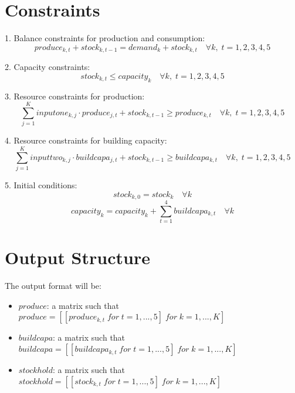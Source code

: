 \documentclass{article}
\begin{document}
\section*{Constraints}
1. Balance constraints for production and consumption:
\[
produce_{k, t} + stock_{k, t-1} = demand_{k} + stock_{k, t} \quad \forall k, \; t=1,2,3,4,5
\]

2. Capacity constraints:
\[
stock_{k, t} \leq capacity_{k} \quad \forall k, \; t=1,2,3,4,5
\]

3. Resource constraints for production:
\[
\sum_{j=1}^{K} inputone_{k, j} \cdot produce_{j, t} + stock_{k, t-1} \geq produce_{k, t} \quad \forall k, \; t=1,2,3,4,5
\]

4. Resource constraints for building capacity:
\[
\sum_{j=1}^{K} inputtwo_{k, j} \cdot buildcapa_{j, t} + stock_{k, t-1} \geq buildcapa_{k, t} \quad \forall k, \; t=1,2,3,4,5
\]

5. Initial conditions:
\[
stock_{k, 0} = stock_{k} \quad \forall k
\]
\[
capacity_{k} = capacity_{k} + \sum_{t=1}^{4} buildcapa_{k, t} \quad \forall k
\]

\section*{Output Structure}
The output format will be:
\begin{itemize}
    \item \( produce \): a matrix such that \( produce = [[produce_{k, t} \; for \; t=1,...,5] \; for \; k=1,...,K] \)
    \item \( buildcapa \): a matrix such that \( buildcapa = [[buildcapa_{k, t} \; for \; t=1,...,5] \; for \; k=1,...,K] \)
    \item \( stockhold \): a matrix such that \( stockhold = [[stock_{k, t} \; for \; t=1,...,5] \; for \; k=1,...,K] \)
\end{itemize}
\end{document}
